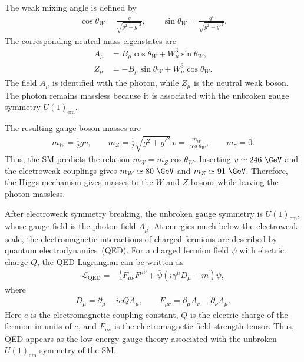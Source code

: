 The weak mixing angle is defined by
\begin{align}
    \cos\theta_{W}
    =
    \frac{g}{\sqrt{g^{2}+g'^{2}}},
    \qquad
    \sin\theta_{W}
    =
    \frac{g'}{\sqrt{g^{2}+g'^{2}}}.
    \label{eq:weak_mixing_angle}
\end{align}
The corresponding neutral mass eigenstates are
\begin{align}
    A_{\mu}
    &=
    B_{\mu}\cos\theta_{W}
    +
    W_{\mu}^{3}\sin\theta_{W},
    \\
    Z_{\mu}
    &=
    -
    B_{\mu}\sin\theta_{W}
    +
    W_{\mu}^{3}\cos\theta_{W}.
    \label{eq:electroweak_mixing}
\end{align}
The field $A_{\mu}$ is identified with the photon, while $Z_{\mu}$ is the neutral weak boson. 
The photon remains massless because it is associated with the unbroken gauge symmetry $U(1)_{\mathrm{em}}$.

The resulting gauge-boson masses are
\begin{align}
    m_{W}
    =
    \frac{1}{2}gv,
    \qquad
    m_{Z}
    =
    \frac{1}{2}\sqrt{g^{2}+g'^{2}}\,v
    =
    \frac{m_{W}}{\cos\theta_{W}},
    \qquad
    m_{\gamma}=0.
    \label{eq:ew_gauge_boson_masses}
\end{align}
Thus, the SM predicts the relation $m_{W}=m_{Z}\cos\theta_{W}$. 
Inserting $v \simeq 246~\GeV$ and the electroweak couplings gives $m_{W}\simeq80~\GeV$ and $m_{Z}\simeq91~\GeV$.
Therefore, the Higgs mechanism gives masses to the $W$ and $Z$ bosons while leaving the photon massless.

After electroweak symmetry breaking, the unbroken gauge symmetry is $U(1)_{\mathrm{em}}$, whose gauge field is the photon field $A_{\mu}$. 
At energies much below the electroweak scale, the electromagnetic interactions of charged fermions are described by quantum electrodynamics~(QED). 
For a charged fermion field $\psi$ with electric charge $Q$, the QED Lagrangian can be written as
\begin{align}
    \mathcal{L}_{\mathrm{QED}}
    =
    -
    \frac{1}{4}
    F_{\mu\nu}F^{\mu\nu}
    +
    \bar{\psi}
    \left(
        i\gamma^{\mu}D_{\mu}
        -
        m
    \right)
    \psi,
    \label{eq:qed_lagrangian}
\end{align}
where
\begin{align}
    D_{\mu}
    =
    \partial_{\mu}
    -
    ieQA_{\mu},
    \qquad
    F_{\mu\nu}
    =
    \partial_{\mu}A_{\nu}
    -
    \partial_{\nu}A_{\mu}.
    \label{eq:qed_covariant_derivative}
\end{align}
Here $e$ is the electromagnetic coupling constant, $Q$ is the electric charge of the fermion in units of $e$, and $F_{\mu\nu}$ is the electromagnetic field-strength tensor. 
Thus, QED appears as the low-energy gauge theory associated with the unbroken $U(1)_{\mathrm{em}}$ symmetry of the SM.


